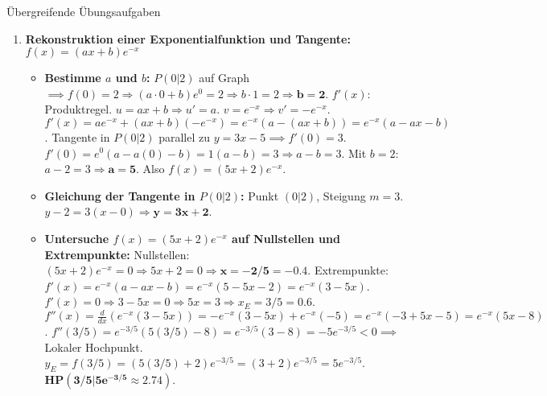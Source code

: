 \begin{loesungsumgebung}{Übergreifende Übungsaufgaben}
\begin{enumerate}
    \item \textbf{Rekonstruktion einer Exponentialfunktion und Tangente: $f(x) = (ax+b)e^{-x}$}
    \begin{itemize}
        \item \textbf{Bestimme $a$ und $b$:}
        $P(0|2)$ auf Graph $\implies f(0)=2 \Rightarrow (a \cdot 0 + b)e^0 = 2 \Rightarrow b \cdot 1 = 2 \Rightarrow \mathbf{b=2}$.
        $f'(x)$: Produktregel. $u=ax+b \Rightarrow u'=a$. $v=e^{-x} \Rightarrow v'=-e^{-x}$.
        $f'(x) = a e^{-x} + (ax+b)(-e^{-x}) = e^{-x}(a - (ax+b)) = e^{-x}(a-ax-b)$.
        Tangente in $P(0|2)$ parallel zu $y=3x-5 \implies f'(0)=3$.
        $f'(0) = e^0(a-a(0)-b) = 1(a-b) = 3 \Rightarrow a-b=3$.
        Mit $b=2$: $a-2=3 \Rightarrow \mathbf{a=5}$.
        Also $f(x) = (5x+2)e^{-x}$.
        \item \textbf{Gleichung der Tangente in $P(0|2)$:} Punkt $(0|2)$, Steigung $m=3$.
        $y-2 = 3(x-0) \Rightarrow \mathbf{y=3x+2}$.
        \item \textbf{Untersuche $f(x)=(5x+2)e^{-x}$ auf Nullstellen und Extrempunkte:}
        Nullstellen: $(5x+2)e^{-x}=0 \Rightarrow 5x+2=0 \Rightarrow \mathbf{x = -2/5 = -0.4}$.
        Extrempunkte: $f'(x) = e^{-x}(a-ax-b) = e^{-x}(5-5x-2) = e^{-x}(3-5x)$.
        $f'(x)=0 \Rightarrow 3-5x=0 \Rightarrow 5x=3 \Rightarrow x_E=3/5 = 0.6$.
        $f''(x) = \frac{d}{dx}(e^{-x}(3-5x)) = -e^{-x}(3-5x) + e^{-x}(-5) = e^{-x}(-3+5x-5) = e^{-x}(5x-8)$.
        $f''(3/5) = e^{-3/5}(5(3/5)-8) = e^{-3/5}(3-8) = -5e^{-3/5} < 0 \implies$ Lokaler Hochpunkt.
        $y_E = f(3/5) = (5(3/5)+2)e^{-3/5} = (3+2)e^{-3/5} = 5e^{-3/5}$.
        $\mathbf{HP(3/5 | 5e^{-3/5} \approx 2.74)}$.
    \end{itemize}


\end{enumerate}
\end{loesungsumgebung}
